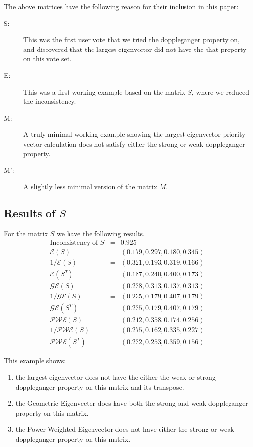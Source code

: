\documentclass[11pt]{article}
\begin{document}
The above matrices have the following reason for their inclusion in this paper:
\begin{framed}
\begin{description}
	\item [S:] This was the first user vote that we tried the doppleganger property on, and discovered that the largest eigenvector did not have the that property on this vote set.
	\item [E:] This was a first working example based on the matrix $S$, where we reduced the inconsistency.
	\item [M:] A truly minimal working example showing the largest eigenvector priority vector calculation does not satisfy either the strong or weak doppleganger property.
	\item [M':] A slightly less minimal version of the matrix $M$.
\end{description}	
\end{framed}

\subsection{Results of $S$}
For the matrix $S$ we have the following results.
\begin{eqnarray*}
	\mbox{Inconsistency of } S &=& 0.925 \\
	\mathcal{E}(S) &=& (0.179,  0.297,  0.180,   0.345) \\
	1/\mathcal{E}(S) &=& ( 0.321,  0.193,  0.319,  0.166) \\
	\mathcal{E}(S^T) &=& ( 0.187, 0.240,  0.400,  0.173) \\
	\mathcal{GE}(S) &=& ( 0.238,  0.313,  0.137,  0.313) \\
	1/\mathcal{GE}(S) &=& ( 0.235, 0.179,  0.407,  0.179) \\
	\mathcal{GE}(S^T) &=& ( 0.235, 0.179,  0.407,  0.179) \\
	\mathcal{PWE}(S) &=& (0.212,  0.358,   0.174,  0.256) \\
	1/\mathcal{PWE}(S) &=& (0.275,  0.162,  0.335,  0.227) \\
	\mathcal{PWE}(S^T) &=& (0.232,  0.253,  0.359,  0.156)
\end{eqnarray*}

This example shows:
\begin{enumerate}
	\item the largest eigenvector does not have the either the weak
or strong doppleganger property on this matrix and its transpose.  
	\item the Geometric Eigenvector does have both the strong and weak doppleganger property on this matrix.
	\item the Power Weighted Eigenvector does not have either the strong or weak doppleganger property on this matrix.
\end{enumerate}
\end{document}
